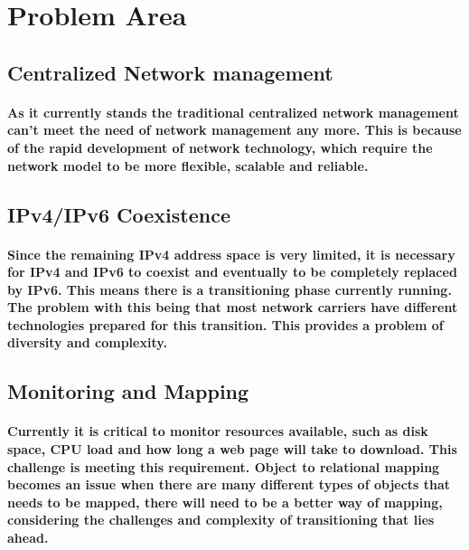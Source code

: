 
%
\section{Problem Area}
   \subsection{Centralized Network management}
   	\paragraph{As it currently stands the traditional centralized network management can't meet the need of network management any more. This is because of the rapid development of network technology, which require the network model to be more flexible, scalable and reliable.}\cite{IEEE} 
   \subsection{IPv4/IPv6 Coexistence}
	\paragraph{Since the remaining IPv4 address space is very limited, it is necessary for IPv4 and IPv6 to coexist and eventually to be completely replaced by IPv6. This means there is a transitioning phase currently running. The problem with this being that most network carriers have different technologies prepared for this transition. This provides a problem of diversity and complexity.}
	\subsection{Monitoring and Mapping}
	 \paragraph{Currently it is critical to monitor resources available, such as disk space, CPU load and how long a web page will take to download. This challenge is meeting this requirement.
	 Object to relational mapping becomes an issue when there are many different types of objects that needs to be mapped, there will need to be a better way of mapping, considering the challenges and complexity of transitioning that lies ahead.}

%